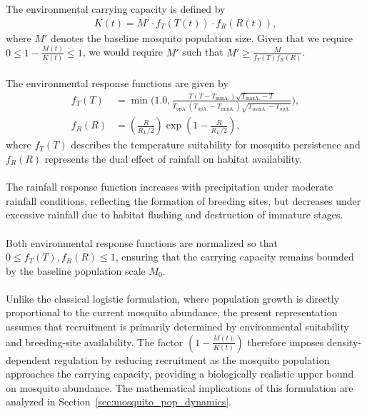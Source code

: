\documentclass[a4paper,fleqn]{cas-dc}
\begin{document}
\\\\
The environmental carrying capacity is defined by
\begin{align}
K(t) = M' \cdot f_T(T(t)) \cdot f_R(R(t)),
\end{align}
where $M'$ denotes the baseline mosquito population size. Given that we require $0\leq 1-\frac{M(t)}{K(t)}\leq 1$, we would require $M'$ such that $M'\geq \frac{M}{f_T(T)f_R(R)}$.%
\\\\
The environmental response functions are given by
\begin{subequations}\label{eq:carryingcapacity}
\begin{align}
f_T(T) &= \min\biggl(1.0, 
\frac{
T(T-T_{\min\text{A.}})
\sqrt{T_{\max\text{A.}}-T}
}{
T_{\mathrm{op}\text{A.}}
(T_{\mathrm{op}\text{A.}}-T_{\min\text{A.}})
\sqrt{T_{\max\text{A.}}-T_{\mathrm{op}\text{A.}}}
}
\biggr), \label{eq:carryingcapacitya}
\\
f_R(R) &= 
\left(\frac{R}{R_L/2}\right)
\exp\left(1-\frac{R}{R_L/2}\right),
\label{eq:carryingcapacityb}
\end{align}
\end{subequations}
where $f_T(T)$ describes the temperature suitability for mosquito persistence and $f_R(R)$ represents the dual effect of rainfall on habitat availability.
\\\\
The rainfall response function increases with precipitation under moderate rainfall conditions, reflecting the formation of breeding sites, but decreases under excessive rainfall due to habitat flushing and destruction of immature stages.
\\\\
Both environmental response functions are normalized so that $0 \leq f_T(T), f_R(R) \leq 1$, 
ensuring that the carrying capacity remains bounded by the baseline population scale $M_0$.
\\\\
Unlike the classical logistic formulation, where population growth is directly proportional to the current mosquito abundance, the present representation assumes that recruitment is primarily determined by environmental suitability and breeding-site availability. The factor
$\left(1-\frac{M(t)}{K(t)}\right)$ therefore imposes density-dependent regulation by reducing recruitment as the mosquito population approaches the carrying capacity, providing a biologically realistic upper bound on mosquito abundance. The mathematical implications of this formulation are analyzed in Section~\ref{sec:mosquito_pop_dynamics}.
\end{document}
